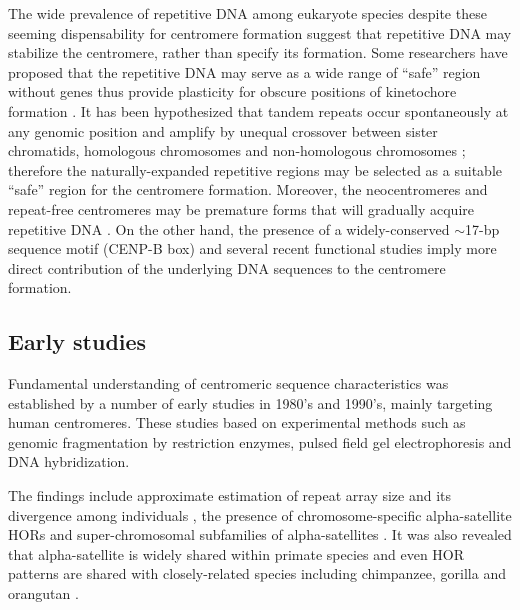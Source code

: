   The wide prevalence of repetitive DNA among eukaryote species despite these seeming dispensability for centromere formation suggest that repetitive DNA may stabilize the centromere, rather than specify its formation. Some researchers have proposed that the repetitive DNA may serve as a wide range of ``safe'' region without genes thus provide plasticity for obscure positions of kinetochore formation \cite{Plohl2014, Fukagawa2014}. It has been hypothesized that tandem repeats occur spontaneously at any genomic position and amplify by unequal crossover between sister chromatids, homologous chromosomes and non-homologous chromosomes \cite{Smith1976, Willard1991, Charlesworth1994}; therefore the naturally-expanded repetitive regions may be selected as a suitable ``safe'' region for the centromere formation. Moreover, the neocentromeres and repeat-free centromeres may be premature forms that will gradually acquire repetitive DNA \cite{Fukagawa2014}. On the other hand, the presence of a widely-conserved $\sim$17-bp sequence motif (CENP-B box) and several recent functional studies \cite{Henikoff2015, Aldrup-MacDonald2016} imply more direct contribution of the underlying DNA sequences to the centromere formation.


\subsection*{Early studies}
  Fundamental understanding of centromeric sequence characteristics was established by a number of early studies in 1980's and 1990's, mainly targeting human centromeres. These studies based on experimental methods such as genomic fragmentation by restriction enzymes, pulsed field gel electrophoresis and DNA hybridization.

  The findings include approximate estimation of repeat array size and its divergence among individuals \cite{Oakey1990, Mahtani1990, Greig1991}, the presence of chromosome-specific alpha-satellite HORs \cite{Willard1987} and super-chromosomal subfamilies of alpha-satellites \cite{Alexandrov1988, Alexandrov2001}. It was also revealed that alpha-satellite is widely shared within primate species and even HOR patterns are shared with closely-related species including chimpanzee, gorilla and orangutan \cite{Willard1991}.


